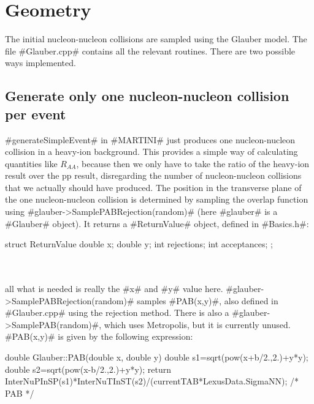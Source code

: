 \chapter{Geometry}
\label{geometry}
The initial nucleon-nucleon collisions are sampled using the Glauber model. The file
#Glauber.cpp# contains all the relevant routines. There are two possible ways implemented.
\section{Generate only one nucleon-nucleon collision per event}

#generateSimpleEvent# in #MARTINI# just produces one nucleon-nucleon collision in a 
heavy-ion background. This provides a simple way of calculating quantities like $R_{AA}$,
because then we only have to take the ratio of the heavy-ion result over the pp result,
disregarding the number of nucleon-nucleon collisions that we actually should have produced.
The position in the transverse plane of the one nucleon-nucleon collision is determined
by sampling the overlap function using #glauber->SamplePABRejection(random)# 
(here #glauber# is a #Glauber# object). It returns a #ReturnValue# object, defined in 
#Basics.h#: \\

\begin{boxedverbatim}
struct ReturnValue 
{
  double x;
  double y;
  int rejections;
  int acceptances;
};
\end{boxedverbatim}\\

~\\
all what is needed is really the #x# and #y# value here.
#glauber->SamplePABRejection(random)# samples #PAB(x,y)#, also defined in #Glauber.cpp#
using the rejection method. There is also a #glauber->SamplePAB(random)#, which uses
Metropolis, but it is currently unused.
#PAB(x,y)# is given by the following expression:\\

\begin{boxedverbatim}
double Glauber::PAB(double x, double y)
{
  double s1=sqrt(pow(x+b/2.,2.)+y*y);
  double s2=sqrt(pow(x-b/2.,2.)+y*y);
  return InterNuPInSP(s1)*InterNuTInST(s2)/(currentTAB*LexusData.SigmaNN);
}/* PAB */
\end{boxedverbatim}\\

